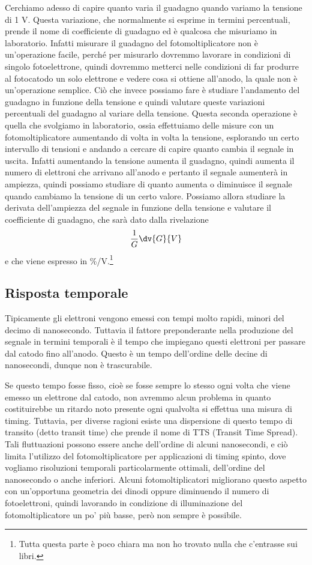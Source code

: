 \vspace{0.2cm}Cerchiamo adesso di capire quanto varia il guadagno quando variamo la tensione di 1 V. Questa variazione, che normalmente si esprime in termini percentuali, prende il nome di coefficiente di guadagno ed è qualcosa che misuriamo in laboratorio. Infatti misurare il guadagno del fotomoltiplicatore non è un'operazione facile, perché per misurarlo dovremmo lavorare in condizioni di singolo fotoelettrone, quindi dovremmo metterci nelle condizioni di far produrre al fotocatodo un solo elettrone e vedere cosa si ottiene all'anodo, la quale non è un'operazione semplice. Ciò che invece possiamo fare è studiare l'andamento del guadagno in funzione della tensione e quindi valutare queste variazioni percentuali del guadagno al variare della tensione. Questa seconda operazione è quella che svolgiamo in laboratorio, ossia effettuiamo delle misure con un fotomoltiplicatore aumentando di volta in volta la tensione, esplorando un certo intervallo di tensioni e andando a cercare di capire quanto cambia il segnale in uscita. Infatti aumentando la tensione aumenta il guadagno, quindi aumenta il numero di elettroni che arrivano all'anodo e pertanto il segnale aumenterà in ampiezza, quindi possiamo studiare di quanto aumenta o diminuisce il segnale quando cambiamo la tensione di un certo valore. Possiamo allora studiare la derivata dell'ampiezza del segnale in funzione della tensione e valutare il coefficiente di guadagno, che sarà dato dalla rivelazione
\begin{equation*}
   \frac{1}{G}\dv{G}{V}
\end{equation*}
e che viene espresso in \%/V.\footnote{Tutta questa parte è poco chiara ma non ho trovato nulla che c'entrasse sui libri.}

\subsection{Risposta temporale}
Tipicamente gli elettroni vengono emessi con tempi molto rapidi, minori del decimo di nanosecondo. Tuttavia il fattore preponderante nella produzione del segnale in termini temporali è il tempo che impiegano questi elettroni per passare dal catodo fino all'anodo. Questo è un tempo dell'ordine delle decine di nanosecondi, dunque non è trascurabile.

Se questo tempo fosse fisso, cioè se fosse sempre lo stesso ogni volta che viene emesso un elettrone dal catodo, non avremmo alcun problema in quanto costituirebbe un ritardo noto presente ogni qualvolta si effettua una misura di timing. Tuttavia, per diverse ragioni esiste una dispersione di questo tempo di transito (detto transit time) che prende il nome di TTS (Transit Time Spread). Tali fluttuazioni possono essere anche dell'ordine di alcuni nanosecondi, e ciò limita l'utilizzo del fotomoltiplicatore per applicazioni di timing spinto, dove vogliamo risoluzioni temporali particolarmente ottimali, dell'ordine del nanosecondo o anche inferiori. Alcuni fotomoltiplicatori migliorano questo aspetto con un'opportuna geometria dei dinodi oppure diminuendo il numero di fotoelettroni, quindi lavorando in condizione di illuminazione del fotomoltiplicatore un po' più basse, però non sempre è possibile.

